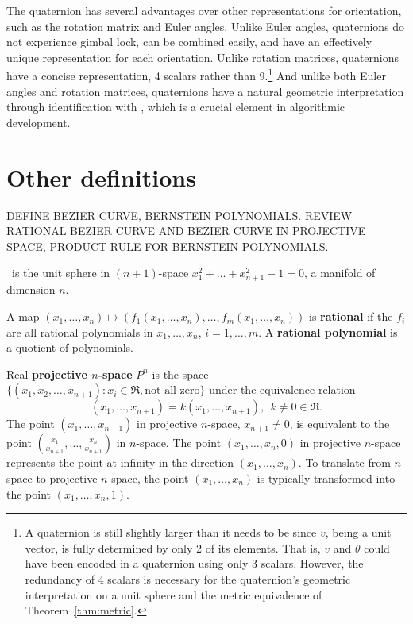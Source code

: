 \documentclass[11pt]{article}
\begin{document}
The quaternion has several advantages over other representations
for orientation, such as the rotation matrix and Euler angles.
Unlike Euler angles, quaternions do not experience gimbal lock,
can be combined easily, and have an effectively unique representation
for each orientation.
Unlike rotation matrices, quaternions have a concise representation,
4 scalars rather than 9.\footnote{A quaternion is still slightly 
	larger than it needs to be since $v$, being a unit vector, 
	is fully determined by only 2 of its elements.
	That is, $v$ and $\theta$ could have been encoded in 
	a quaternion using only 3 scalars.
	However, the redundancy of 4 scalars is necessary for
	the quaternion's geometric interpretation on a unit sphere 
	and the metric equivalence of Theorem~\ref{thm:metric}.}
And unlike both Euler angles and rotation matrices, 
quaternions have a natural geometric interpretation through identification
with , which is a crucial element in algorithmic development.

\clearpage

\section{Other definitions}

DEFINE BEZIER CURVE, BERNSTEIN POLYNOMIALS.
REVIEW RATIONAL BEZIER CURVE AND BEZIER CURVE IN PROJECTIVE SPACE,
PRODUCT RULE FOR BERNSTEIN POLYNOMIALS. 

\begin{defn2}
\ is the unit sphere in $(n+1)$-space $x_1^2 + \ldots + x_{n+1}^2 - 1 = 0$,
a manifold of dimension $n$.
\end{defn2}

\begin{defn2}
A map $(x_1,\ldots,x_n) \mapsto (f_1 (x_1,\ldots,x_n),\ldots,f_m (x_1,\ldots,x_n))$
is {\bf rational} if 
the $f_i$ are all rational polynomials in $x_1,\ldots,x_n$, $i=1,\ldots,m$.
A {\bf rational polynomial} is a quotient of polynomials.
\end{defn2}

\begin{defn2}
\label{defn:projspace}
Real {\bf projective $n$-space} $P^n$ is the space 
$\{ (x_1,x_2,\ldots,x_{n+1}) : x_i \in \Re, \mbox{not all zero} \}$
under the equivalence relation 
\begin{equation}
\label{eq:projequivalence}
(x_1,\ldots,x_{n+1}) = k(x_1,\ldots,x_{n+1}),\ \ k \neq 0 \in \Re.
\end{equation}
The point $(x_1,\ldots,x_{n+1})$ in projective $n$-space, $x_{n+1} \neq 0$,
is equivalent to the point $(\frac{x_1}{x_{n+1}},\ldots,\frac{x_n}{x_{n+1}})$
in $n$-space.
The point $(x_1,\ldots,x_n,0)$ in projective $n$-space represents the point
at infinity in the direction $(x_1,\ldots,x_n)$.
To translate from $n$-space to projective $n$-space, the point 
$(x_1,\ldots,x_n)$ is typically transformed into the point $(x_1,\ldots,x_n,1)$.
\end{defn2}
\end{document}
